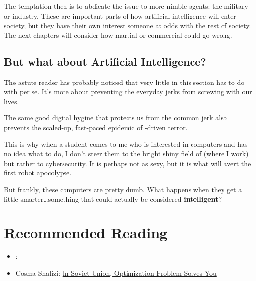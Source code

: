 The temptation then is to abdicate the issue to more nimble agents: the military or industry.  
These are important parts of how artificial intelligence will enter society, but they have their own interest someone at odds with the rest of society.
The next chapters will consider how martial or commercial  could go wrong.

\subsection{But what about Artificial Intelligence?}

The astute reader has probably noticed that very little in this
section has to do with  per se.  It's more about preventing
the everyday jerks from screwing with our lives.

The same good digital hygine that protects us from the common jerk
also prevents the scaled-up, fast-paced epidemic of -driven terror.  

This is why when a student comes to me who is interested in computers
and has no idea what to do, I don't steer them to the bright shiny
field of  (where I work) but rather to cybersecurity.  It is
perhaps not as sexy, but it is what will avert the first robot apocolypse.

But frankly, these computers are pretty dumb.  What happens when they
get a little smarter\dots something that could actually be considered
{\bf intelligent}?


\clearpage

\section{Recommended Reading}


\begin{itemize}

  \item \citet{spufford-10}: 

  \item Cosma Shalizi: \href{http://crookedtimber.org/2012/05/30/in-soviet-union-optimization-problem-solves-you/}{In Soviet Union, Optimization Problem Solves You}

\end{itemize}
